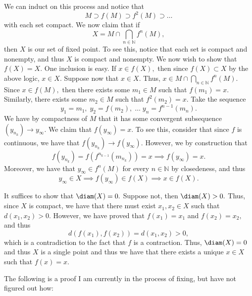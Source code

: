 \documentclass[11pt]{article}
\newcommand{\bbN}{\mathbb{N}}
\begin{document}
\begin{enumerate}
\begin{solution}
        We can induct on this process and notice that 
        \[M \supset f(M) \supset f^2(M)\supset \dots\] with each set compact. We now claim that if 
        \[X = M \cap \bigcap_{n\in \bbN} f^n(M),\] then $X$ is our set of fixed point. To see this, notice that each set is compact and nonempty, and thus $X$ is compact and nonempty. We now wish to show that $f(X) = X.$ One inclusion is easy. If $x \in f(X),$ then since $f(X)\subset X$ by the above logic, $x \in X.$ Suppose now that $x \in X.$ Thus, $x \in M \cap \bigcap_{n\in \bbN} f^n(M).$ Since $x \in f(M),$ then there exists some $m_1 \in M$ such that $f(m_1) = x.$ Similarly, there exists some $m_2 \in M$ such that $f^2(m_2) = x.$ Take the sequence 
        \[y_1 = m_1, \; y_2 = f(m_2), \; \dots \; y_n= f^{n-1}(m_n).\]
        We have by compactness of $M$ that it has some convergent subsequence $(y_{n_k}) \to y_{\infty}.$ We claim that $f(y_\infty) = x.$ To see this, consider that since $f$ is continuous, we have that $f(y_{n_k}) \to f(y_{\infty}).$ However, we by construction that \[f(y_{n_k}) = f(f^{n_{k-1}}(m_{n_k})) = x\implies f(y_\infty) = x.\] Moreover, we have that $y_\infty \in f^n(M)$ for every $n \in \bbN$ by closedeness, and thus \[y_\infty \in X \implies f(y_\infty) \in f(X) \implies x \in f(X).\]

        It suffices to show that $\diam(X) = 0.$ Suppose not, then $\diam(X) > 0.$ Thus, since $X$ is compact, we have that there must exist $x_1, x_2 \in X$ such that $d(x_1, x_2) >0.$ However, we have proved that $f(x_1) = x_1$ and $f(x_2) =  x_2,$ and thus 
        \[d(f(x_1), f(x_2)) = d(x_1, x_2) >0,\] which is a contradiction to the fact that $f$ is a contraction. Thus, $\diam(X) = 0$ and thus $X$ is a single point and thus we have that there exists a unique $x \in X$ such that $f(x) = x.$
    \end{solution}
    \begin{reflection}
        The following is a proof I am currently in the process of fixing, but have not figured out how:\\
        

\end{reflection}
\end{enumerate}
\end{document}
